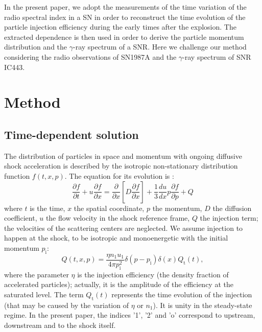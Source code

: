 \documentclass{aa}
\newcommand\rs[1]{_\mathrm{#1}}
\newcommand\pd[2]{\frac{\partial{#1}}{\partial{#2}}}
\newcommand\g{$\gamma$}
\begin{document}
In the present paper, we adopt the measurements of the time variation of the radio spectral index in a SN in order to reconstruct the time evolution of the particle injection efficiency during the early times after the explosion. The extracted dependence is then used in order to derive the particle momentum distribution and the \g-ray spectrum of a SNR. 
Here we challenge our method considering the radio observations of SN1987A and the \g-ray spectrum of SNR IC443.





\section{Method}
\label{alpha:sect-equation}

\subsection{Time-dependent solution}

The distribution of particles in space and momentum with ongoing diffusive shock acceleration is described by the isotropic non-stationary distribution function $f(t,x,p)$. 
The equation for its evolution is \citep{Skilling1975a,Jones-1990}:
\begin{equation}
 \pd{f}{t}+u\pd{f}{x}=\pd{}{x}\left[D\pd{f}{x}\right]+\frac{1}{3}\frac{du}{dx}p\pd{f}{p}+Q
 \label{kineq:kineq}
\end{equation}
where $t$ is the time, $x$ the spatial coordinate, $p$ the momentum, $D$ the diffusion coefficient, $u$ the flow velocity in the shock reference frame, $Q$ the injection term;  
the velocities of the scattering centers are neglected. 
We assume injection to happen at the shock, to be isotropic and monoenergetic with the initial momentum $p\rs{i}$:
\begin{equation}
 Q(t,x,p)=\frac{\eta n_1u_1}{4\pi p\rs{i}^2}\delta(p-p\rs{i})\delta(x)Q\rs{t}(t),
 \label{kineq:umova2b}
\end{equation}
where the parameter $\eta$ is the injection efficiency (the density fraction of accelerated particles); actually, it is the amplitude of the efficiency at the saturated level. 
The term $Q\rs{t}(t)$ represents the time evolution of the injection (that may be caused by the variation of $\eta$ or $n_1$). It is unity in the steady-state regime. 
In the present paper, the indices '1', '2' and 'o' correspond to upstream, downstream and to the shock itself. 
\end{document}
